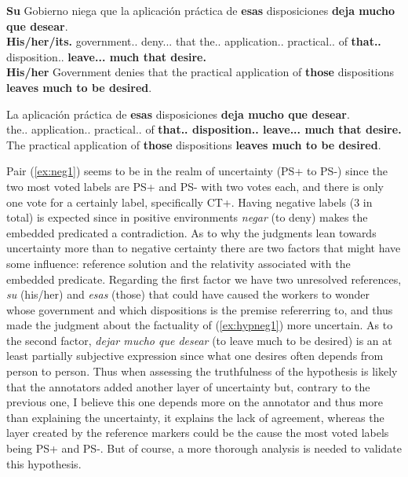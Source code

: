 \begin{exe}
  \ex\label{ex:neg1}
    \begin{xlist}
      \item{\gll \textbf{Su} Gobierno niega que la aplicación práctica de \textbf{esas} disposiciones \textbf{deja mucho que desear}.\\ \textbf{His/her/its.\Sg{}} government.\M.\Sg{} deny.\Prs.\Ind.\Tsg{} that the.\F.\Sg{} application.\F.\Sg{} practical.\F.\Sg{} of \textbf{that.\F.\Pl{}} disposition.\F.\Pl{} \textbf{leave.\Prs.\Ind.\Tsg{} much that desire.\Inf{}} \\\glt \textbf{His/her} Government denies that the practical application of \textbf{those} dispositions \textbf{leaves much to be desired}.}
      \item{\gll La aplicación práctica de \textbf{esas} disposiciones \textbf{deja mucho que desear}.\\ the.\F.\Sg{} application.\F.\Sg{} practical.\F.\Sg{} of \textbf{that.\F.\Pl{} disposition.\F.\Pl{} leave.\Prs.\Ind.\Tsg{} much that desire.\Inf{}}\\\glt The practical application of \textbf{those} dispositions \textbf{leaves much to be desired}.} \label{ex:hypneg1}
    \end{xlist}
\end{exe}

Pair (\ref{ex:neg1}) seems to be in the realm of uncertainty (PS+ to PS-) since the two most voted labels are PS+ and PS- with two votes each, and there is only one vote for a certainly label, specifically CT+. Having negative labels ($3$ in total) is expected since in positive environments \textit{negar} (to deny) makes the embedded predicated a contradiction. As to why the judgments lean towards uncertainty more than to negative certainty there are two factors that might have some influence: reference solution and the relativity associated with the embedded predicate. Regarding the first factor we have two unresolved references, \textit{su} (his/her) and \textit{esas} (those) that could have caused the workers to wonder whose government and which dispositions is the premise refererring to, and thus made the judgment about the factuality of (\ref{ex:hypneg1}) more uncertain. As to the second factor, \textit{dejar mucho que desear} (to leave much to be desired) is an at least partially subjective expression since what one desires often depends from person to person. Thus when assessing the truthfulness of the hypothesis is likely that the annotators added another layer of uncertainty but, contrary to the previous one, I believe this one depends more on the annotator and thus more than explaining the uncertainty, it explains the lack of agreement, whereas the layer created by the reference markers could be the cause the most voted labels being PS+ and PS-. But of course, a more thorough analysis is needed to validate this hypothesis.\\

